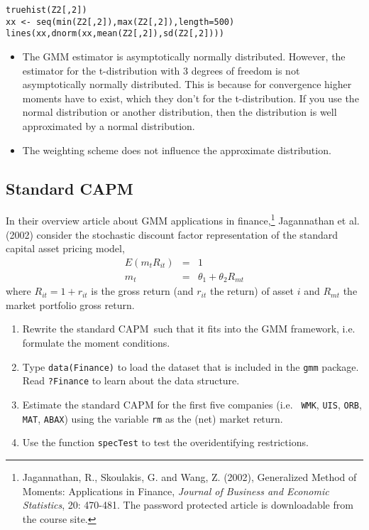 \documentclass{article}
\begin{document}
\begin{solution}
\begin{verbatim}
truehist(Z2[,2])
xx <- seq(min(Z2[,2]),max(Z2[,2]),length=500)
lines(xx,dnorm(xx,mean(Z2[,2]),sd(Z2[,2])))
\end{verbatim}
\begin{itemize}
  \item The GMM estimator is asymptotically normally distributed.
      However, the estimator for the t-distribution with 3 degrees of
      freedom is not asymptotically normally distributed. This is because
      for convergence higher moments have to exist, which they don't for
      the t-distribution. If you use the normal distribution or another
      distribution, then the distribution is well approximated by a
      normal distribution.
  \item The weighting scheme does not influence the approximate
      distribution.
\end{itemize}
\end{solution}

\subsection{Standard CAPM}

In their overview article about GMM applications in finance,\footnote{%
Jagannathan, R., Skoulakis, G. and Wang, Z. (2002), Generalized Method of
Moments: Applications in Finance, \emph{Journal of Business and Economic
Statistics}, 20: 470-481. The password protected article is downloadable
from the course site.} Jagannathan et al. (2002) consider the stochastic
discount factor representation of the standard capital asset pricing model,%
\begin{eqnarray*}
E\left( m_{t}R_{it}\right) &=&1 \\
m_{t} &=&\theta _{1}+\theta _{2}R_{mt}
\end{eqnarray*}%
where $R_{it}=1+r_{it}$ is the gross return (and $r_{it}$ the return) of
asset $i$ and $R_{mt}$ the market portfolio gross return.

\begin{enumerate}
\item Rewrite the standard CAPM\ such that it fits into the GMM framework,
i.e. formulate the moment conditions.

\item Type \texttt{data(Finance)} to load the dataset that is included in
the \texttt{gmm} package. Read \texttt{?Finance} to learn about the data
structure.

\item Estimate the standard CAPM for the first five companies (i.e. \texttt{%
WMK}, \texttt{UIS}, \texttt{ORB}, \texttt{MAT}, \texttt{ABAX}) using the
variable \texttt{rm} as the (net) market return.

\item Use the function \texttt{specTest} to test the overidentifying
restrictions.
\end{enumerate}
\end{document}
